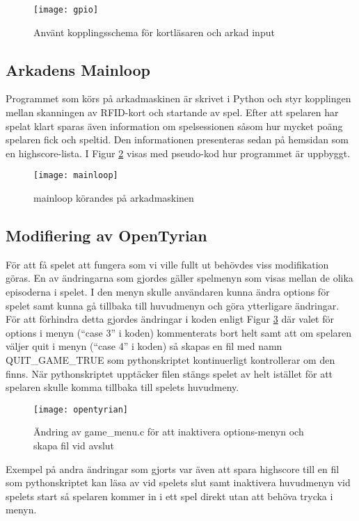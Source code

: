 \documentclass[12pt,fleqn,openany]{book} %
\begin{document}
\begin{figure}[h]
\centering\texttt{[image: gpio]}
\caption{Använt kopplingsschema för kortläsaren och arkad input}
\label{fig_gpio}
\end{figure}

\subsection{Arkadens Mainloop}
Programmet som körs på arkadmaskinen är skrivet i Python och styr kopplingen mellan skanningen av RFID-kort och startande av spel. 
Efter att spelaren har spelat klart sparas även information om spelsessionen såsom hur mycket poäng spelaren fick och speltid. 
Den informationen presenteras sedan på hemsidan som en highscore-lista. I Figur \ref{fig_mainloop} visas med pseudo-kod hur programmet är uppbyggt. 

\begin{figure}[!h]
\texttt{[image: mainloop]}
\label{fig_mainloop}
\caption{mainloop körandes på arkadmaskinen}
\end{figure}

\subsection{Modifiering av OpenTyrian}
För att få spelet att fungera som vi ville fullt ut behövdes viss modifikation göras. En av ändringarna som gjordes 
gäller spelmenyn som visas mellan de olika episoderna i spelet. I den menyn skulle användaren kunna ändra options för 
spelet samt kunna gå tillbaka till huvudmenyn och göra ytterligare ändringar. 
För att förhindra detta gjordes ändringar i koden enligt Figur \ref{fig_opentyrian} där valet för options i menyn 
(“case 3” i koden) kommenterats bort helt samt att om spelaren väljer quit i menyn (“case 4” i koden) så skapas en 
fil med namn QUIT\_GAME\_TRUE som pythonskriptet kontinuerligt kontrollerar om den finns. När pythonskriptet upptäcker 
filen stängs spelet av helt istället för att spelaren skulle komma tillbaka till spelets huvudmeny.

\begin{figure}[!h]
\centering\texttt{[image: opentyrian]}
\caption{Ändring av game\_menu.c för att inaktivera options-menyn och skapa fil vid avslut}
\label{fig_opentyrian}
\end{figure}
Exempel på andra ändringar som gjorts var även att spara highscore till en fil som pythonskriptet kan läsa av vid 
spelets slut samt inaktivera huvudmenyn vid spelets start så spelaren kommer in i ett spel direkt utan att behöva 
trycka i menyn.
\end{document}

